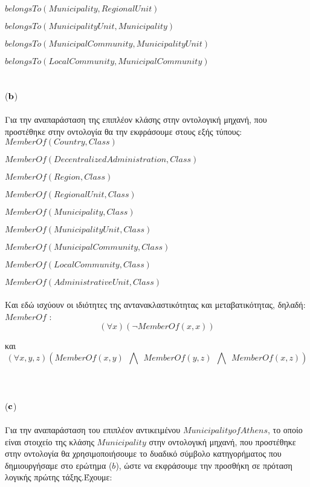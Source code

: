 \documentclass[10pt]{article}
\begin{document}
$belongsTo(Municipality ,RegionalUnit)$

$belongsTo(MunicipalityUnit, Municipality)$

$belongsTo(MunicipalCommunity, MunicipalityUnit)$

$belongsTo(LocalCommunity , MunicipalCommunity)$
\\ \\ \\ 
($\bf b$) \normalfont \\ \\
Για την αναπαράσταση της επιπλέον κλάσης στην οντολογική μηχανή, που προστέθηκε στην οντολογία θα την εκφράσουμε στους εξής τύπους: \\

$MemberOf(Country, Class)$

$MemberOf(Decentralized Administration, Class)$

$MemberOf(Region, Class)$

$MemberOf(RegionalUnit, Class)$

$MemberOf(Municipality, Class)$

$MemberOf(MunicipalityUnit, Class)$

$MemberOf(MunicipalCommunity, Class)$

$MemberOf(LocalCommunity, Class)$

$MemberOf(AdministrativeUnit, Class)$ \\ \\
Και εδώ ισχύουν οι ιδιότητες της αντανακλαστικότητας και μεταβατικότητας, δηλαδή: \\

\hspace{5mm}  $MemberOf$ :
\[
(\forall x)(\neg MemberOf(x,x))
\]

\hspace{80mm} και
\[
(\forall x,y,z)\left( MemberOf(x,y) \ \ \bigwedge \ \ MemberOf(y,z) \ \ \bigwedge \ \ MemberOf(x,z) \right )
\]
\\ \\ \\
($\bf c$) \normalfont \\ \\
Για την αναπαράσταση του επιπλέον αντικειμένου $Municipality of Athens$, το οποίο είναι στοιχείο της κλάσης $Municipality$ στην οντολογική μηχανή, που προστέθηκε στην οντολογία θα χρησιμοποιήσουμε το δυαδικό σύμβολο κατηγορήματος που δημιουργήσαμε στο ερώτημα ($b$), ώστε να εκφράσουμε την προσθήκη σε πρόταση λογικής πρώτης τάξης.Έχουμε: \\
\end{document}
